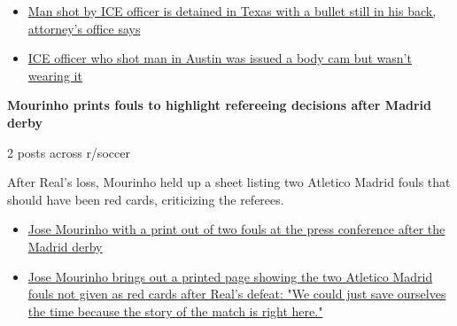 \documentclass[11pt,a4paper]{article}
\begin{document}
\begin{itemize}
  \item \href{https://www.reddit.com/r/news/comments/1wminye/man_shot_by_ice_officer_is_detained_in_texas_with/}{Man shot by ICE officer is detained in Texas with a bullet still in his back, attorney's office says}
  \item \href{https://www.reddit.com/r/news/comments/1wnndel/ice_officer_who_shot_man_in_austin_was_issued_a/}{ICE officer who shot man in Austin was issued a body cam but wasn't wearing it}
\end{itemize}
\vspace{6pt}
\textbf{Mourinho prints fouls to highlight refereeing decisions after Madrid derby}\par
{\small 2 posts across r/soccer}\par
\vspace{2pt}After Real's loss, Mourinho held up a sheet listing two Atletico Madrid fouls that should have been red cards, criticizing the referees.\par
\begin{itemize}
  \item \href{https://www.reddit.com/r/soccer/comments/1wllt19/jose_mourinho_with_a_print_out_of_two_fouls_at/}{Jose Mourinho with a print out of two fouls at the press conference after the Madrid derby}
  \item \href{https://www.reddit.com/r/soccer/comments/1wlm06y/jose_mourinho_brings_out_a_printed_page_showing/}{Jose Mourinho brings out a printed page showing the two Atletico Madrid fouls not given as red cards after Real's defeat: "We could just save ourselves the time because the story of the match is right here."}
\end{itemize}
\vspace{6pt}
\end{document}
